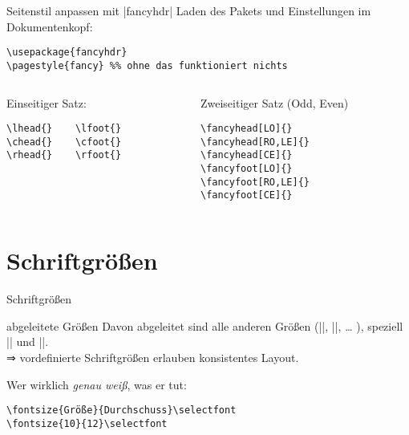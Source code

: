\begin{frame}[fragile]{Seitenstil anpassen mit |fancyhdr|}
Laden des Pakets und Einstellungen im Dokumentenkopf:
\begin{lstlisting}
\usepackage{fancyhdr}
\pagestyle{fancy} %% ohne das funktioniert nichts
\end{lstlisting}
\begin{columns}
\begin{column}{.4\textwidth}
Einseitiger Satz:
\begin{lstlisting}
\lhead{}    \lfoot{}
\chead{}    \cfoot{}
\rhead{}    \rfoot{}
\end{lstlisting}
\end{column}
\pause
\begin{column}{.4\textwidth}
Zweiseitiger Satz (Odd, Even)
\begin{lstlisting}
\fancyhead[LO]{}
\fancyhead[RO,LE]{}
\fancyhead[CE]{}
\fancyfoot[LO]{}
\fancyfoot[RO,LE]{}
\fancyfoot[CE]{}
\end{lstlisting}
\end{column}
\end{columns}
\end{frame}

\section{Schriftgrößen}
\begin{frame}[fragile]{Schriftgrößen}

\begin{block}{abgeleitete Größen}
Davon abgeleitet sind alle anderen Größen (|\tiny|, |\small|, … ), speziell |\footnotesize| und |\scriptsize|.\\
⇒ vordefinierte Schriftgrößen erlauben konsistentes Layout.
\end{block}
\pause
Wer wirklich \emph{genau weiß}, was er tut:
\begin{verbatim}
\fontsize{Größe}{Durchschuss}\selectfont
\fontsize{10}{12}\selectfont
\end{verbatim}
\end{frame}

